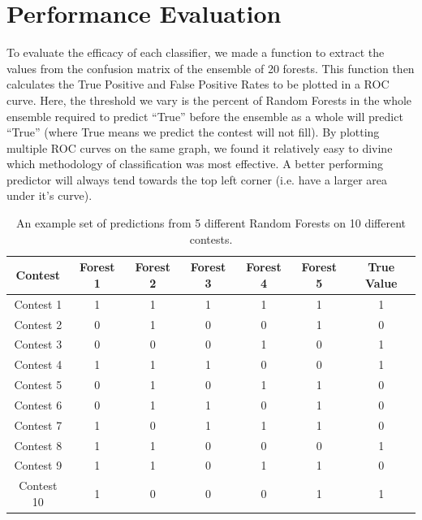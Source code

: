 \section{Performance Evaluation}

To evaluate the efficacy of each classifier, we made a function to extract the values from the confusion matrix of the ensemble of 20 forests. This function then calculates the True Positive and False Positive Rates to be plotted in a ROC curve. Here, the threshold we vary is the percent of Random Forests in the whole ensemble required to predict ``True'' before the ensemble as a whole will predict ``True'' (where True means we predict the contest will not fill). By plotting multiple ROC curves on the same graph, we found it relatively easy to divine which methodology of classification was most effective. A better performing predictor will always tend towards the top left corner (i.e. have a larger area under it's curve).

\begin{table}
\begin{center}
\begin{tabular}{| c | c | c | c | c | c | c |}
\hline
 \textbf{Contest} & \textbf{Forest 1} & \textbf{Forest 2} & \textbf{Forest 3} & \textbf{Forest 4} & \textbf{Forest 5} & \textbf{True Value} \\ 
 \hline
 Contest 1 & 1 & 1 & 1 & 1 & 1 & 1 \\  
 \hline
 Contest 2 & 0 & 1 & 0 & 0 & 1 & 0 \\
 \hline
 Contest 3 & 0 & 0 & 0 & 1 & 0 & 1 \\
 \hline
 Contest 4 & 1 & 1 & 1 & 0 & 0 & 1 \\
 \hline
 Contest 5 & 0 & 1 & 0 & 1 & 1 & 0 \\
 \hline
 Contest 6 & 0 & 1 & 1 & 0 & 1 & 0 \\
 \hline
 Contest 7 & 1 & 0 & 1 & 1 & 1 & 0 \\
 \hline
 Contest 8 & 1 & 1 & 0 & 0 & 0 & 1 \\
 \hline
 Contest 9 & 1 & 1 & 0 & 1 & 1 & 0 \\
 \hline
 Contest 10 & 1 & 0 & 0 & 0 & 1 & 1 \\
 \hline
\end{tabular}
\caption[Example of Random Forest Predictions]{An example set of predictions from 5 different Random Forests on 10 different contests.}
\end{center}
\end{table}

